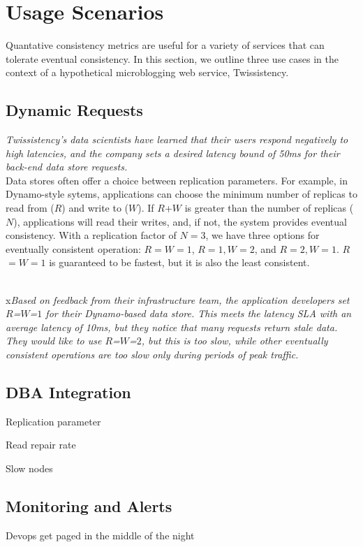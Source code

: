 \section{Usage Scenarios}
\label{sec:scenarios}

Quantative consistency metrics are useful for a variety of services
that can tolerate eventual consistency. In this section, we outline
three use cases in the context of a hypothetical microblogging web
service, Twissistency.

\subsection{Dynamic Requests}

\textit{Twissistency's data scientists have learned that their users
  respond negatively to high latencies, and the company sets a desired
  latency bound of 50ms for their back-end data store requests.}\\

Data stores often offer a choice between replication parameters. For
example, in Dynamo-style sytems, applications can choose the minimum
number of replicas to read from ($R$) and write to ($W$). If $R$+$W$
is greater than the number of replicas ($N$), applications will read
their writes, and, if not, the system provides eventual
consistency. With a replication factor of $N=3$, we have three options
for eventually consistent operation: $R$$=$$W$$=$$1$, $R$$=$$1$$,
W$$=$$2$, and $R$$=$$2$$, W$$=$$1$. $R$$=$$W$$=$$1$ is guaranteed to
be fastest, but it is also the least consistent.

\\x\textit{Based on feedback from their infrastructure team, the
  application developers set $R$=$W$=$1$ for their Dynamo-based data
  store. This meets the latency SLA with an average latency of 10ms,
  but they notice that many requests return stale data. They would
  like to use $R$=$W$=$2$, but this is too slow, while other
  eventually consistent operations are too slow only during periods of
  peak traffic.}\\

\subsection{DBA Integration}

Replication parameter

Read repair rate

Slow nodes

\subsection{Monitoring and Alerts}

Devops get paged in the middle of the night
